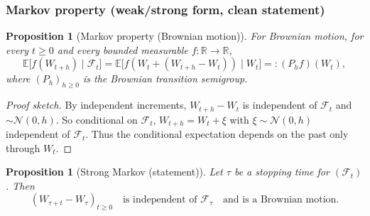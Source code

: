 \documentclass[11pt]{article}
\newtheorem{proposition}[theorem]{Proposition}
\theoremstyle{definition}
\theoremstyle{remark}
\newcommand{\E}{\mathbb{E}}
\newcommand{\R}{\mathbb{R}}
\newcommand{\cF}{\mathcal{F}}
\begin{document}
\subsubsection*{Markov property (weak/strong form, clean statement)}

\begin{proposition}[Markov property (Brownian motion)]
For Brownian motion, for every $t\ge0$ and every bounded measurable $f:\R\to\R$,
\[
\E\big[f(W_{t+h})\mid \cF_t\big] = \E\big[f(W_t + (W_{t+h}-W_t))\mid W_t\big]
=: (P_h f)(W_t),
\]
where $(P_h)_{h\ge0}$ is the Brownian transition semigroup.
\end{proposition}

\begin{proof}[Proof sketch]
By independent increments, $W_{t+h}-W_t$ is independent of $\cF_t$ and $\sim \mathcal{N}(0,h)$.
So conditional on $\cF_t$, $W_{t+h}=W_t + \xi$ with $\xi\sim\mathcal{N}(0,h)$ independent of $\cF_t$.
Thus the conditional expectation depends on the past only through $W_t$.
\end{proof}

\begin{proposition}[Strong Markov (statement)]
Let $\tau$ be a stopping time for $(\cF_t)$. Then
\[
(W_{\tau+t}-W_\tau)_{t\ge0}
\quad\text{is independent of } \cF_\tau
\quad\text{and is a Brownian motion.}
\]
\end{proposition}
\end{document}
